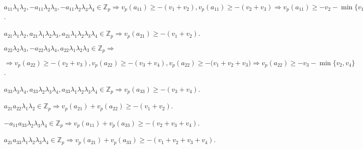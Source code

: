 \documentclass{article}
\begin{document}
$a_{11}\lambda_{1}\lambda_{2},-a_{11}\lambda_{2}\lambda_{3},-a_{11}\lambda_{2}\lambda_{3}\lambda_{4}\in\mathbb{Z}_{p}\Rightarrow{v_{p}(a_{11})\geq{-(v_{1}+v_{2})},v_{p}(a_{11})\geq{-(v_{2}+v_{3})}}\Rightarrow{v_{p}(a_{11})\geq{-v_{2}-\min\{v_{1},v_{3}\}}}$. 

$a_{21}\lambda_{1}\lambda_{2},a_{21}\lambda_{1}\lambda_{2}\lambda_{3},a_{21}\lambda_{1}\lambda_{2}\lambda_{3}\lambda_{4}\in\mathbb{Z}_{p}\Rightarrow{v_{p}(a_{21})\geq{-(v_{1}+v_{2})}}$.

$a_{22}\lambda_{2}\lambda_{3},-a_{22}\lambda_{3}\lambda_{4},a_{22}\lambda_{1}\lambda_{2}\lambda_{3}\in\mathbb{Z}_{p}\Rightarrow$

$\Rightarrow{v_{p}(a_{22})\geq{-(v_{2}+v_{3})},v_{p}(a_{22})\geq{-(v_{3}+v_{4})},v_{p}(a_{22})\geq{-(v_{1}+v_{2}+v_{3}}})\Rightarrow{v_{p}(a_{22})\geq{-v_{3}-\min\{v_{2},v_{4}\}}}$.

$a_{33}\lambda_{3}\lambda_{4},a_{33}\lambda_{2}\lambda_{3}\lambda_{4},a_{33}\lambda_{1}\lambda_{2}\lambda_{3}\lambda_{4}\in\mathbb{Z}_{p}\Rightarrow{v_{p}(a_{33})\geq{-(v_{3}+v_{4})}}$.

$a_{21}a_{22}\lambda_{1}\lambda_{2}\in\mathbb{Z}_{p}\Rightarrow{v_{p}(a_{21})+v_{p}(a_{22})\geq{-(v_{1}+v_{2})}}$.

$-a_{11}a_{33}\lambda_{2}\lambda_{3}\lambda_{4}\in\mathbb{Z}_{p}\Rightarrow{v_{p}(a_{11})+v_{p}(a_{33})\geq{-(v_{2}+v_{3}+v_{4})}}$.

$a_{21}a_{33}\lambda_{1}\lambda_{2}\lambda_{3}\lambda_{4}\in\mathbb{Z}_{p}\Rightarrow{v_{p}(a_{21})+v_{p}(a_{33})\geq{-(v_{1}+v_{2}+v_{3}+v_{4})}}$.
\end{document}
